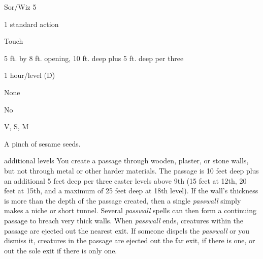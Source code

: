 
\begin{description*}
\item[Level:] Sor/Wiz 5
\item[Casting Time:] 1 standard action
\item[Range:] Touch
\item[Effect:] 5 ft. by 8 ft. opening, 10 ft. deep plus 5 ft. deep per three
\item[Duration:] 1 hour/level (D)
\item[Saving Throw:] None
\item[Spell Resistance:] No
\item[Components:] V, S, M
\item[Arcane Material Component:] A pinch of sesame seeds.
\end{description*}

additional levels
You create a passage through wooden, plaster, or stone walls, but not through metal
or other harder materials. The passage is 10 feet deep plus an additional 5 feet
deep per three caster levels above 9th (15 feet at 12th, 20 feet at 15th, and a
maximum of 25 feet deep at 18th level). If the wall's thickness is more than the
depth of the passage created, then a single \textit{passwall} simply makes a niche
or short tunnel. Several \textit{passwall} spells can then form a continuing passage
to breach very thick walls. When \textit{passwall} ends, creatures within the passage
are ejected out the nearest exit. If someone dispels the \textit{passwall} or you
dismiss it, creatures in the passage are ejected out the far exit, if there is
one, or out the sole exit if there is only one.
